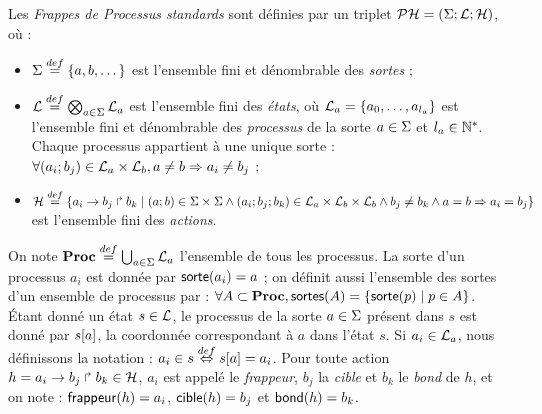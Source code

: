 \begin{definition}
  Les \emph{Frappes de Processus standards} sont définies
  par un triplet $\mathcal{PH} = (\Sigma; \mathcal{L}; \mathcal{H})$, où :
  \begin{itemize}
    \item $\Sigma \stackrel{def}= \{a, b, \dots\}$ est l'ensemble fini et dénombrable des \emph{sortes} ;
    \item $\mathcal{L} \stackrel{def}= \bigotimes_{a \in \Sigma} \mathcal{L}_a$ est l'ensemble fini des \emph{états},
      où $\mathcal{L}_a = \{a_0, \ldots, a_{l_a}\}$ est l'ensemble fini et dénombrable
      des \emph{processus} de la sorte $a \in \Sigma$ et $l_a \in \mathbb{N}^*$.
      Chaque processus appartient à une unique sorte :
      $\forall (a_i; b_j) \in \mathcal{L}_a \times \mathcal{L}_b, a \neq b \Rightarrow a_i \neq b_j$ ;
    \item $\mathcal{H} \stackrel{def}= \{a_i\rightarrow b_j\Rsh b_k \mid (a; b) \in \Sigma \times \Sigma \wedge
      (a_i; b_j; b_k) \in \mathcal{L}_a \times \mathcal{L}_b \times \mathcal{L}_b \wedge
      b_j \neq b_k \wedge a = b \Rightarrow a_i = b_j \}$ est l'ensemble fini des \emph{actions}.
  \end{itemize}
\end{definition}
%
\noindent
On note $\mathbf{Proc} \stackrel{def}= \bigcup_{a \in \Sigma} \mathcal{L}_a$ l'ensemble de tous les processus.
La sorte d'un processus $a_i$ est donnée par $\mathsf{sorte}(a_i) = a$ ;
on définit aussi l'ensemble des sortes d'un ensemble de processus par :
$\forall A \subset \mathbf{Proc}, \mathsf{sortes}(A) = \{ \mathsf{sorte}(p) \mid p \in A \}$.
Étant donné un état $s \in \mathcal{L}$, le processus de la sorte $a \in \Sigma$ présent dans $s$ est donné
par ${s[a]}$, \cad la coordonnée correspondant à $a$ dans l'état $s$.
Si $a_i \in \mathcal{L}_a$, nous définissons la notation : $a_i \in s \stackrel{def}\Leftrightarrow {s[a]} = a_i$.
Pour toute action $h = a_i\rightarrow b_j\Rsh b_k \in \mathcal{H}$,
$a_i$ est appelé le \emph{frappeur}, $b_j$ la \emph{cible} et $b_k$ le \emph{bond} de $h$,
et on note : $\mathsf{frappeur}(h) = a_i$, $\mathsf{cible}(h) = b_j$ et $\mathsf{bond}(h) = b_k$.

